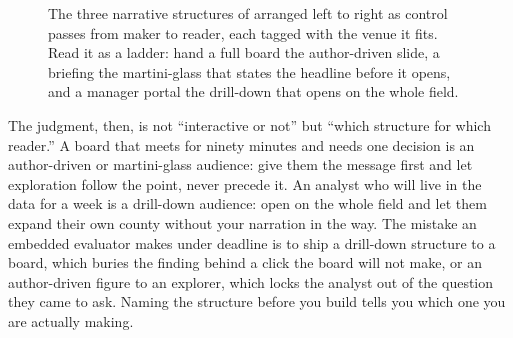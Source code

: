 \documentclass[
    a4paper,
    fontsize=10pt,
    twoside=true,
    numbers=noenddot,
]{kaobook}
\begin{document}
\begin{figure}[htbp]
\centering
{}
\caption[Narrative structures on the control spectrum]{The three narrative structures of \textcite{segel2010narrative} arranged left to right as control passes from maker to reader, each tagged with the venue it fits. Read it as a ladder: hand a full board the author-driven slide, a briefing the martini-glass that states the headline before it opens, and a manager portal the drill-down that opens on the whole field.}
\label{fig:ch10-viz-spectrum}
\end{figure}

The judgment, then, is not \enquote{interactive or not} but \enquote{which structure for which reader.} A board that meets for ninety minutes and needs one decision is an author-driven or martini-glass audience: give them the message first and let exploration follow the point, never precede it. An analyst who will live in the data for a week is a drill-down audience: open on the whole field and let them expand their own county without your narration in the way. The mistake an embedded evaluator makes under deadline is to ship a drill-down structure to a board, which buries the finding behind a click the board will not make, or an author-driven figure to an explorer, which locks the analyst out of the question they came to ask. Naming the structure before you build tells you which one you are actually making.
\end{document}
